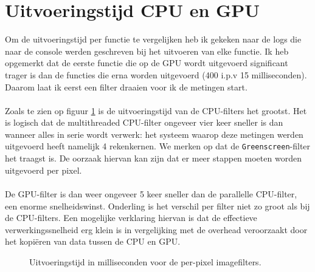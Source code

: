 \documentclass[12pt]{article}
\begin{document}
\section*{Uitvoeringstijd CPU en GPU}

Om de uitvoeringstijd per functie te vergelijken heb ik gekeken naar de logs die naar de console werden geschreven bij het uitvoeren van elke functie.
Ik heb opgemerkt dat de eerste functie die op de GPU wordt uitgevoerd significant trager is dan de functies die erna worden uitgevoerd (400 i.p.v 15 milliseconden).
Daarom laat ik eerst een filter draaien voor ik de metingen start.
\\ 
\\
Zoals te zien op figuur \ref{fig:pixel} is de uitvoeringstijd van de CPU-filters het grootst.
Het is logisch dat de multithreaded CPU-filter ongeveer vier keer sneller is dan wanneer alles in serie wordt verwerk: het systeem waarop deze metingen werden uitgevoerd heeft namelijk 4 rekenkernen.
We merken op dat de {\tt Greenscreen}-filter het traagst is.
De oorzaak hiervan kan zijn dat er meer stappen moeten worden uitgevoerd per pixel.
\\
\\
De GPU-filter is dan weer ongeveer 5 keer sneller dan de parallelle CPU-filter, een enorme snelheidswinst.
Onderling is het verschil per filter niet zo groot als bij de CPU-filters.
Een mogelijke verklaring hiervan is dat de effectieve verwerkingssnelheid erg klein is in vergelijking met de overhead veroorzaakt door het kopiëren van data tussen de CPU en GPU.

\begin{figure}[H]
    \caption{Uitvoeringstijd in milliseconden voor de per-pixel imagefilters.}
    \label{fig:pixel}
\end{figure}
\end{document}
